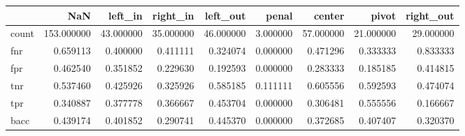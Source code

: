 \begin{tabular}{lrrrrrrrr}
\toprule
{} &         NaN &    left\_in &   right\_in &   left\_out &     penal &     center &      pivot &  right\_out \\
\midrule
count &  153.000000 &  43.000000 &  35.000000 &  46.000000 &  3.000000 &  57.000000 &  21.000000 &  29.000000 \\
fnr   &    0.659113 &   0.400000 &   0.411111 &   0.324074 &  0.000000 &   0.471296 &   0.333333 &   0.833333 \\
fpr   &    0.462540 &   0.351852 &   0.229630 &   0.192593 &  0.000000 &   0.283333 &   0.185185 &   0.414815 \\
tnr   &    0.537460 &   0.425926 &   0.325926 &   0.585185 &  0.111111 &   0.605556 &   0.592593 &   0.474074 \\
tpr   &    0.340887 &   0.377778 &   0.366667 &   0.453704 &  0.000000 &   0.306481 &   0.555556 &   0.166667 \\
bacc  &    0.439174 &   0.401852 &   0.290741 &   0.445370 &  0.000000 &   0.372685 &   0.407407 &   0.320370 \\
\bottomrule
\end{tabular}
